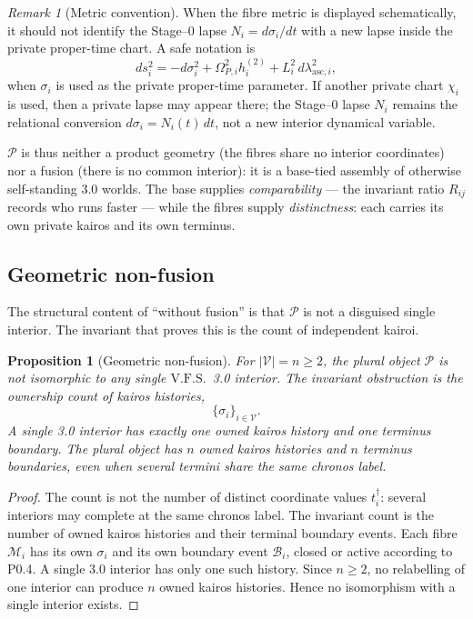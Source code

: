 \documentclass[11pt,a4paper]{article}
\newcommand{\VFS}{\ensuremath{\mathrm{V.F.S.}}}
\theoremstyle{definition}
\theoremstyle{plain}
\newtheorem{proposition}[definition]{Proposition}
\theoremstyle{remark}
\newtheorem{remark}[definition]{Remark}
\begin{document}
\begin{remark}[Metric convention]
When the fibre metric is displayed schematically, it should not identify the
Stage--0 lapse \(N_i=d\sigma_i/dt\) with a new lapse inside the private proper-time
chart. A safe notation is
\[
ds_i^2
=
-d\sigma_i^2
+
\Omega_{P,i}^2 h^{(2)}_i
+
L_i^2\,d\lambda_{\mathrm{asc},i}^2,
\]
when \(\sigma_i\) is used as the private proper-time parameter. If another private
chart \(\chi_i\) is used, then a private lapse may appear there; the Stage--0 lapse
\(N_i\) remains the relational conversion \(d\sigma_i=N_i(t)\,dt\), not a new
interior dynamical variable.
\end{remark}

\(\mathcal P\) is thus neither a product geometry (the fibres share no interior
coordinates) nor a fusion (there is no common interior): it is a base-tied assembly of
otherwise self-standing 3.0 worlds. The base supplies \emph{comparability} --- the
invariant ratio \(R_{ij}\) records who runs faster --- while the fibres supply
\emph{distinctness}: each carries its own private kairos and its own terminus.

\subsection{Geometric non-fusion}

The structural content of ``without fusion'' is that \(\mathcal P\) is not a disguised
single interior. The invariant that proves this is the count of independent kairoi.

\begin{proposition}[Geometric non-fusion]\label{prop:nonfusion}
For \(|\mathcal V|=n\ge2\), the plural object \(\mathcal P\) is not isomorphic to
any single \VFS\ 3.0 interior. The invariant obstruction is the ownership count of
kairos histories,
\[
\{\sigma_i\}_{i\in\mathcal V}.
\]
A single 3.0 interior has exactly one owned kairos history and one terminus
boundary. The plural object has \(n\) owned kairos histories and \(n\) terminus
boundaries, even when several termini share the same chronos label.
\end{proposition}

\begin{proof}
The count is not the number of distinct coordinate values \(t_i^\dagger\): several
interiors may complete at the same chronos label. The invariant count is the number
of owned kairos histories and their terminal boundary events. Each fibre
\(\mathcal M_i\) has its own \(\sigma_i\) and its own boundary event
\(\mathcal B_i\), closed or active according to P0.4. A single 3.0 interior has only
one such history. Since \(n\ge2\), no relabelling of one interior can produce \(n\)
owned kairos histories. Hence no isomorphism with a single interior exists.
\qedhere
\end{proof}
\end{document}
